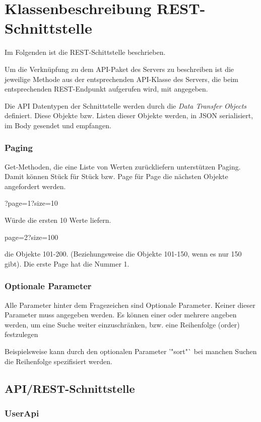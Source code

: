 \chapter{Klassenbeschreibung REST-Schnittstelle}
Im Folgenden ist die REST-Schittstelle beschrieben. 

Um die Verknüpfung zu dem API-Paket des Servers zu beschreiben ist die jeweilige Methode aus der entsprechenden API-Klasse des Servers, die beim entsprechenden REST-Endpunkt aufgerufen wird, mit angegeben. 

Die API Datentypen der Schnittstelle werden durch die {\em Data Transfer Objects} definiert. Diese Objekte bzw. Listen dieser Objekte werden, in JSON serialisiert, im Body gesendet und empfangen. 

\subsection{Paging}
Get-Methoden, die eine Liste von Werten zurückliefern unterstützen Paging. 
Damit können Stück für Stück bzw. Page für Page die nächsten Objekte angefordert werden. 

?page=1?size=10

Würde die ersten 10 Werte liefern. 

page=2?size=100 

die Objekte 101-200. (Beziehungsweise die Objekte 101-150, wenn es nur 150 gibt). Die erste Page hat die Nummer 1.

\subsection{Optionale Parameter}
Alle Parameter hinter dem Fragezeichen sind Optionale Parameter. Keiner dieser Parameter muss angegeben werden. Es können einer oder mehrere angeben werden, um eine Suche weiter einzuschränken, bzw. eine Reihenfolge (order) festzulegen

Beispielsweise kann durch den optionalen Parameter '"sort"` bei manchen Suchen die Reihenfolge spezifisiert werden. 

\section{API/REST-Schnittstelle}
\subsection{UserApi}
\renewcommand{\put}[1] {
{\textbf{\newline HTTP Endpoint}: \colorbox{orange}{PUT} \textbf{#1}} }
\newcommand{\get}[1] {
{\textbf{\newline HTTP Endpoint}: \colorbox{cyan}{GET} \textbf{#1} }}
\newcommand{\gettwoline}[1] {
{\textbf{\newline HTTP Endpoint}:\newline \colorbox{cyan}{GET} \textbf{#1} }}
\newcommand{\post}[1]{
{\textbf{\newline HTTP Endpoint}: \colorbox{green}{POST} \textbf{#1} }}
\newcommand{\delete}[1]{
{\textbf{\newline HTTP Endpoint}: \colorbox{red}{DELETE} \textbf{#1} }}


